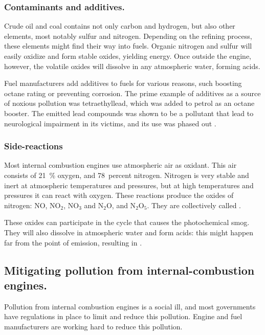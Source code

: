 \subsubsection{Contaminants and additives.}

Crude oil and coal contains not only carbon and hydrogen, but also other
elements, most notably sulfur and nitrogen. Depending on the refining process,
these elements might find their way into fuels. Organic nitrogen and sulfur will
easily oxidize and form stable oxides, yielding energy. Once outside the engine,
however, the volatile oxides will dissolve in any atmospheric water, forming
acids. \autocite{Duncan2016}

Fuel manufacturers add additives to fuels for various reasons, such boosting
octane rating or preventing corrosion. The prime example of additives as a
source of noxious pollution was tetraethyllead, which was added to petrol as an
octane booster. The emitted lead compounds was shown to be a pollutant that lead
to neurological impairment in its victims, and its use was phased out
\autocite{Needleman2000}.

\subsubsection{Side-reactions}

Most internal combustion engines use atmospheric air as oxidant. This air
consists of \SI{21}{\percent} oxygen, and \SI{78}{percent} nitrogen. Nitrogen is
very stable and inert at atmospheric temperatures and pressures, but at high
temperatures and pressures it can react with oxygen. These reactions produce the
oxides of nitrogen: NO, NO$_2$, NO$_3$ and N$_2$O, and N$_2$O$_5$. They are
collectively called \nox.

These oxides can participate in the cycle that causes the photochemical smog.
They will also dissolve in atmospheric water and form acids: this might happen
far from the point of emission, resulting in . 

\subsection{Mitigating pollution from internal\hyp{}combustion engines.}
 
Pollution from internal combustion engines is a social ill, and most governments
have regulations in place to limit and reduce this pollution. Engine and fuel
manufacturers are working hard to reduce this pollution.

